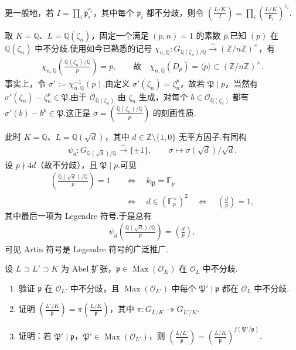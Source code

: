 更一般地，若 $I=\prod_i\mathfrak p_i^{e_i}$，其中每个 $\mathfrak p_i$ 都不分歧，则令 $\left(\frac{L/K}{I}\right)=\prod_i\left(\frac{L/K}{\mathfrak p_i}\right)^{e_i}$.
\begin{example*}[分圆数域]
取 $K=\mathbb Q$、$L=\mathbb Q(\zeta_n)$，固定一个满足 $(p,n)=1$ 的素数 $p$.已知 $(p)$ 在 $\mathbb Q(\zeta_n)$ 中不分歧.使用如今已熟悉的记号 $\chi_{n,\mathbb Q}:G_{\mathbb Q(\zeta_n)/\mathbb Q}\xrightarrow{\sim}(\mathbb Z/n\mathbb Z)^\times$，有
\begin{align*}
\chi_{n,\mathbb Q}\left(\frac{\mathbb Q(\zeta_n)/\mathbb Q}{p}\right)=p,\qquad\text{故}\quad\chi_{n,\mathbb Q}(D_p)=\langle p\rangle\subset(\mathbb Z/n\mathbb Z)^\times.
\end{align*}
事实上，令 $\sigma':=\chi_{n,\mathbb Q}^{-1}(p)$.由定义 $\sigma'(\zeta_n)=\zeta_n^p$，故若 $\mathfrak P\mid p$，当然有 $\sigma'(\zeta_n)-\zeta_n^p\in\mathfrak P$.由于 $\mathcal O_{\mathbb Q(\zeta_n)}$ 由 $\zeta_n$ 生成，对每个 $b\in\mathcal O_{\mathbb Q(\zeta_n)}$ 都有 $\sigma'(b)-b^p\in\mathfrak P$.这正是 $\sigma=\left(\frac{\mathbb Q(\zeta_n)/\mathbb Q}{p}\right)$ 的刻画性质.
\end{example*}
\begin{example*}[二次数域]
此时 $K=\mathbb Q$、$L=\mathbb Q(\sqrt d)$，其中 $d\in\mathbb Z\setminus\{1,0\}$ 无平方因子.有同构
\begin{align*}
\psi_d:G_{\mathbb Q(\sqrt d)/\mathbb Q}\xrightarrow{\sim}\{\pm1\},\qquad\sigma\longmapsto\sigma(\sqrt d)/\sqrt d.
\end{align*}
设 $p\nmid4d$（故不分歧），且 $\mathfrak P\mid p$.可见
\begin{align*}
\left(\frac{\mathbb Q(\sqrt d)/\mathbb Q}{p}\right)=1
&\quad\Longleftrightarrow\quad k_{\mathfrak P}=\mathbb F_p\\
&\quad\Longleftrightarrow\quad d\in(\mathbb F_p^\times)^2
\quad\Longleftrightarrow\quad\left(\frac dp\right)=1,
\end{align*}
其中最后一项为 Legendre 符号.于是总有
\begin{align*}
\psi_d\left(\frac{\mathbb Q(\sqrt d)/\mathbb Q}{p}\right)=\left(\frac dp\right),
\end{align*}
可见 Artin 符号是 Legendre 符号的广泛推广.
\end{example*}
\begin{exercise*}
设 $L\supset L'\supset K$ 为 Abel 扩张，$\mathfrak p\in\operatorname{Max}(\mathcal O_K)$ 在 $\mathcal O_L$ 中不分歧.
\begin{enumerate}[label=\roman*)]
\item 验证 $\mathfrak p$ 在 $\mathcal O_{L'}$ 中不分歧，且 $\operatorname{Max}(\mathcal O_{L'})$ 中每个 $\mathfrak P'\mid\mathfrak p$ 都在 $\mathcal O_L$ 中不分歧.
\item 证明 $\left(\frac{L'/K}{\mathfrak p}\right)=\pi\left(\frac{L/K}{\mathfrak p}\right)$，其中 $\pi:G_{L/K}\twoheadrightarrow G_{L'/K}$.
\item 证明：若 $\mathfrak P'\mid\mathfrak p$，$\mathfrak P'\in\operatorname{Max}(\mathcal O_{L'})$，则 $\left(\frac{L/L'}{\mathfrak p}\right)=\left(\frac{L/K}{\mathfrak p}\right)^{f(\mathfrak P'/\mathfrak p)}$.
\end{enumerate}
\end{exercise*}


